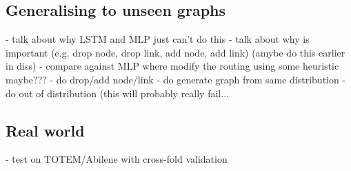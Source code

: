 \subsection{Generalising to unseen graphs}

- talk about why LSTM and MLP just can't do this
- talk about why is important (e.g. drop node, drop link, add node, add link) (amybe do this earlier in diss)
- compare against MLP where modify the routing using some heuristic maybe???
- do drop/add node/link
- do generate graph from same distribution
- do out of distribution (this will probably really fail...

\subsection{Real world}

- test on TOTEM/Abilene with cross-fold validation
